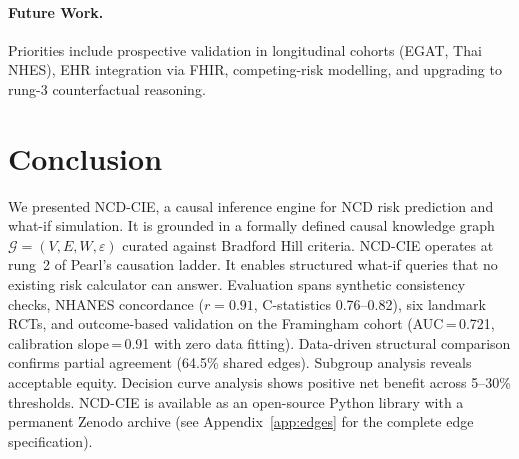 \documentclass[runningheads]{llncs}
\begin{document}
\paragraph{Future Work.}
Priorities include prospective validation in longitudinal cohorts
(EGAT, Thai NHES), EHR integration via FHIR, competing-risk
modelling, and upgrading to rung-3 counterfactual reasoning.

\section{Conclusion}\label{sec:conclusion}

We presented NCD-CIE, a causal inference engine for NCD risk
prediction and what-if simulation.
It is grounded in a formally defined causal knowledge graph
$\mathcal{G} = (V, E, W, \varepsilon)$ curated against Bradford Hill
criteria.
NCD-CIE operates at rung~2 of Pearl's causation ladder.
It enables structured what-if queries that no existing risk
calculator can answer.
Evaluation spans synthetic consistency checks, NHANES concordance
($r = 0.91$, C-statistics 0.76--0.82), six landmark RCTs, and
outcome-based validation on the Framingham cohort
(AUC\,=\,0.721, calibration slope\,=\,0.91 with zero data fitting).
Data-driven structural comparison confirms partial agreement
(64.5\% shared edges).
Subgroup analysis reveals acceptable equity.
Decision curve analysis shows positive net benefit across 5--30\%
thresholds.
NCD-CIE is available as an open-source Python library with a
permanent Zenodo archive (see Appendix~\ref{app:edges} for the
complete edge specification).
\end{document}
